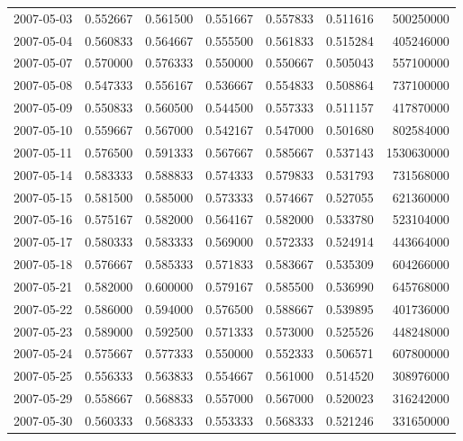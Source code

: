 \begin{tabular}{lrrrrrr}
2007-05-03 &    0.552667 &    0.561500 &    0.551667 &    0.557833 &    0.511616 &   500250000 \\
2007-05-04 &    0.560833 &    0.564667 &    0.555500 &    0.561833 &    0.515284 &   405246000 \\
2007-05-07 &    0.570000 &    0.576333 &    0.550000 &    0.550667 &    0.505043 &   557100000 \\
2007-05-08 &    0.547333 &    0.556167 &    0.536667 &    0.554833 &    0.508864 &   737100000 \\
2007-05-09 &    0.550833 &    0.560500 &    0.544500 &    0.557333 &    0.511157 &   417870000 \\
2007-05-10 &    0.559667 &    0.567000 &    0.542167 &    0.547000 &    0.501680 &   802584000 \\
2007-05-11 &    0.576500 &    0.591333 &    0.567667 &    0.585667 &    0.537143 &  1530630000 \\
2007-05-14 &    0.583333 &    0.588833 &    0.574333 &    0.579833 &    0.531793 &   731568000 \\
2007-05-15 &    0.581500 &    0.585000 &    0.573333 &    0.574667 &    0.527055 &   621360000 \\
2007-05-16 &    0.575167 &    0.582000 &    0.564167 &    0.582000 &    0.533780 &   523104000 \\
2007-05-17 &    0.580333 &    0.583333 &    0.569000 &    0.572333 &    0.524914 &   443664000 \\
2007-05-18 &    0.576667 &    0.585333 &    0.571833 &    0.583667 &    0.535309 &   604266000 \\
2007-05-21 &    0.582000 &    0.600000 &    0.579167 &    0.585500 &    0.536990 &   645768000 \\
2007-05-22 &    0.586000 &    0.594000 &    0.576500 &    0.588667 &    0.539895 &   401736000 \\
2007-05-23 &    0.589000 &    0.592500 &    0.571333 &    0.573000 &    0.525526 &   448248000 \\
2007-05-24 &    0.575667 &    0.577333 &    0.550000 &    0.552333 &    0.506571 &   607800000 \\
2007-05-25 &    0.556333 &    0.563833 &    0.554667 &    0.561000 &    0.514520 &   308976000 \\
2007-05-29 &    0.558667 &    0.568833 &    0.557000 &    0.567000 &    0.520023 &   316242000 \\
2007-05-30 &    0.560333 &    0.568333 &    0.553333 &    0.568333 &    0.521246 &   331650000 \\

\end{tabular}
